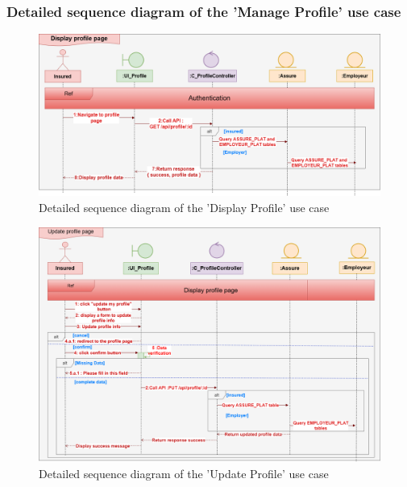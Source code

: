 \subsubsection{Detailed sequence diagram of the 'Manage Profile' use case}
\begin{figure}[h!]
    \centering
    \includegraphics[width=1\textwidth]{figures/det display profile.png}
    \caption{Detailed sequence diagram of the 'Display Profile' use case}
\end{figure}
\begin{figure}[h!]
    \centering
    \includegraphics[width=1\textwidth]{figures/det update profile.png}
    \caption{Detailed sequence diagram of the 'Update Profile' use case}
\end{figure}
\clearpage
